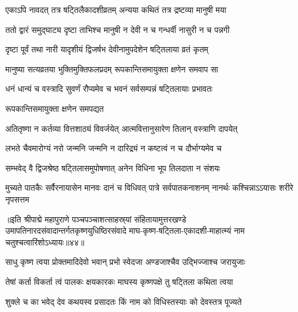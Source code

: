 \twolineshloka
{एकाऽपि नावदत् तत्र षट्तिलैकादशीव्रतम्}
{अन्यया कथितं तत्र द्रष्टव्या मानुषी मया}%

\twolineshloka
{ततो द्वारं समुद्घाट्य दृष्टा ताभिश्च मानुषी}
{न देवी न च गन्धर्वी नासुरी न च पन्नगी}%

\twolineshloka
{दृष्टा पूर्वं तथा नारी यादृशीयं द्विजर्षभ}
{देवीनामुपदेशेन षट्तिलाया व्रतं कृतम्}%

\twolineshloka
{मानुष्या सत्यव्रतया भुक्तिमुक्तिफलप्रदम्}
{रूपकान्तिसमायुक्ता क्षणेन समवाप सा}%

\twolineshloka
{धनं धान्यं च वस्त्रादि सुवर्णं रौप्यमेव च}
{भवनं सर्वसम्पन्नं षट्तिलायाः प्रभावतः}%

\onelineshloka
{रूपकान्तिसमायुक्ता क्षणेन समपद्यत}%

\twolineshloka
{अतितृष्णा न कर्तव्या वित्तशाठ्यं विवर्जयेत्}
{आत्मवित्तानुसारेण तिलान् वस्त्राणि दापयेत्}%

\twolineshloka
{लभते चैवमारोग्यं नरो जन्मनि जन्मनि}
{न दारिद्र्यं न कष्टत्वं न च दौर्भाग्यमेव च}%

\twolineshloka
{सम्भवेद् वै द्विजश्रेष्ठ षट्तिलासमुपोषणात्}
{अनेन विधिना भूप तिलदाता न संशयः}%

\threelineshloka
{मुच्यते पातकैः सर्वैरनायासेन मानवः}
{दानं च विधिवत् पात्रे सर्वपातकनाशनम्}
{नानर्थः कश्चिन्नाऽऽयासः शरीरे नृपसत्तम}%


॥इति श्रीपाद्मे महापुराणे पञ्चपञ्चाशत्साहस्र्यां संहितायामुत्तरखण्डे उमापतिनारदसंवादान्तर्गतकृष्णयुधिष्ठिरसंवादे माघ-कृष्ण-षट्तिला-एकादशी-माहात्म्यं नाम चतुश्चत्वारिंशोऽध्यायः॥४४॥

\genMangalaShloka

\hyperref[sec:ekadashi_mahatmyam_padma_puranam]{\closesub}
\clearpage

\label{sec:padma-magha-shukla-jaya}

\ganapatyadiDhyanam
\padmaPuranam



\twolineshloka
{साधु कृष्ण त्वया प्रोक्तमादिदेवो भवान् प्रभो}
{स्वेदजा अण्डजाश्चैव उद्भिज्जाश्च जरायुजाः}%

\twolineshloka
{तेषां कर्ता विकर्ता त्वं पालकः क्षयकारकः}
{माघस्य कृष्णपक्षे तु षट्तिला कथिता त्वया}%

\twolineshloka
{शुक्ले च का भवेद् देव कथयस्व प्रसादतः}
{किं नाम को विधिस्तस्याः को देवस्तत्र पूज्यते}%

